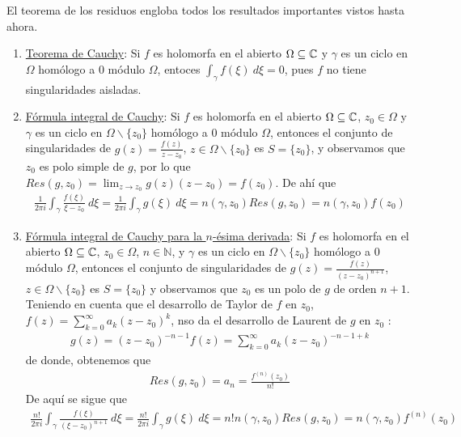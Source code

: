 \begin{obs}
    El teorema de los residuos engloba todos los resultados importantes vistos hasta ahora.
    \begin{enumerate}
        \item \underline{Teorema de Cauchy}: Si $f$ es holomorfa en el abierto $\Omega \subseteq \mathbb{C}$ y $\gamma$ es un ciclo en $\Omega$ homólogo a 0 módulo $\Omega$, entoces $\int_{\gamma}{f(\xi) \ d\xi} = 0$, pues $f$ no tiene singularidades aisladas.
        \item \underline{Fórmula integral de Cauchy}: Si $f$ es holomorfa en el abierto $\Omega \subseteq \mathbb{C}$, $z_0 \in \Omega$ y $\gamma$ es un ciclo en $\Omega \backslash \{z_0\}$ homólogo a 0 módulo $\Omega$, entonces el conjunto de singularidades de $g(z) = \frac{f(z)}{z-z_0}$, $z \in \Omega \backslash \{z_0\}$ es $S = \{z_0\}$, y observamos que $z_0$ es polo simple de $g$, por lo que $Res(g,z_0) = \lim_{z \to z_0} g(z)(z-z_0) = f(z_0)$. De ahí que
              \begin{align*}
                  \frac{1}{2\pi i}\int_{\gamma} \frac{f(\xi)}{\xi - z_0} \ d\xi = \frac{1}{2\pi i} \int_{\gamma} g(\xi) \ d\xi = n(\gamma,z_0)Res(g,z_0) = n(\gamma,z_0)f(z_0)
              \end{align*}
        \item \underline{Fórmula integral de Cauchy para la $n$-ésima derivada}: Si $f$ es holomorfa en el abierto $\Omega \subseteq \mathbb{C}$, $z_0 \in \Omega$, $n \in \mathbb{N}$, y $\gamma$ es un ciclo en $\Omega \backslash \{z_0\}$ homólogo a 0 módulo $\Omega$, entonces el conjunto de singularidades de $g(z) = \frac{f(z)}{(z-z_0)^{n+1}}$, $z \in \Omega \backslash \{z_0\}$ es $S = \{z_0\}$ y observamos que $z_0$ es un polo de $g$ de orden $n+1$. Teniendo en cuenta que el desarrollo de Taylor de $f$ en $z_0$, $f(z) = \sum_{k=0}^{\infty}{a_k (z-z_0)^k}$, nso da el desarrollo de Laurent de $g$ en $z_0$ :
              \begin{align*}
                  g(z) = (z-z_0)^{-n-1}f(z) = \sum_{k=0}^{\infty}{a_k(z-z_0)^{-n-1+k}}
              \end{align*}
              de donde, obtenemos que
              \begin{align*}
                  Res(g,z_0) = a_n = \frac{f^{(n)}(z_0)}{n!}
              \end{align*}
              De aquí se sigue que
              \begin{align*}
                  \frac{n!}{2\pi i} \int_{\gamma} \frac{f(\xi)}{(\xi - z_0)^{n+1}} \ d\xi = \frac{n!}{2\pi i} \int_{\gamma} g(\xi) \ d\xi = n!n(\gamma,z_0)Res(g,z_0) = n(\gamma,z_0)f^{(n)}(z_0)
              \end{align*}
    \end{enumerate}
\end{obs}

